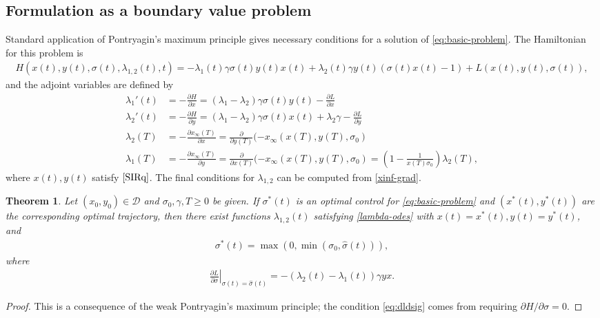 \documentclass[english,12pt,letter]{article}
\newtheorem{thm}{Theorem}
\newcommand{\Rnot}{\sigma_0}
\newcommand{\Sinf}{x_\infty}
\newcommand{\dom}{{\mathcal D}}
\begin{document}
\subsection{Formulation as a boundary value problem\label{sec:pmp}}
Standard application of Pontryagin's maximum principle gives necessary conditions
for a solution of \eqref{eq:basic-problem}.  The Hamiltonian for this problem is
\begin{align} \label{eq:ham}
    H(x(t),y(t), \sigma(t), \lambda_{1,2}(t), t) = -\lambda_1(t) \gamma \sigma(t) y(t) x(t) + \lambda_2(t)\gamma y(t)(\sigma(t) x(t) - 1) + L(x(t),y(t),\sigma(t)),
\end{align}
and the adjoint variables are defined by
\begin{subequations}\label{lambda-odes}
\begin{align} 
    \lambda_1'(t) & = -\frac{\partial H}{\partial x} = (\lambda_1-\lambda_2)\gamma\sigma(t) y(t) - \frac{\partial L}{\partial x} \\
    \lambda_2'(t) & = -\frac{\partial H}{\partial y} = (\lambda_1-\lambda_2)\gamma\sigma(t) x(t) + \lambda_2 \gamma - \frac{\partial L}{\partial y} \\
    \lambda_2(T) & = -\frac{\partial \Sinf(T)}{\partial x} = \frac{\partial }{\partial y(T)} (-x_\infty(x(T),y(T),\Rnot) \\
    \lambda_1(T) & = -\frac{\partial \Sinf(T)}{\partial y} =\frac{\partial }{\partial x(T)} (-x_\infty(x(T),y(T),\Rnot) = \left(1-\frac{1}{x(T)\Rnot}\right)\lambda_2(T),
\end{align}
\end{subequations}
where $x(t), y(t)$ satisfy $\eqref{SIRq}$.
The final conditions for $\lambda_{1,2}$ can be computed from \eqref{xinf-grad}.

\begin{thm}
    Let $(x_0, y_0)\in\dom$ and $\Rnot, \gamma, T\ge 0$ be given.  If $\sigma^*(t)$ is an optimal
    control for \eqref{eq:basic-problem} and $(x^*(t),y^*(t))$ are the corresponding optimal
    trajectory, then there exist functions
    $\lambda_{1,2}(t)$ satisfying \eqref{lambda-odes} with $x(t)=x^*(t), y(t)=y^*(t)$, and
    \begin{align} \label{eq:sigma-c2}
        \sigma^*(t) = \max\left(0,\min\left(\sigma_0,\hat{\sigma}(t)\right)\right),
    \end{align}
    where
    \begin{align} \label{eq:dldsig}
        \left. \frac{\partial L}{\partial \sigma}\right|_{\sigma(t)=\hat{\sigma}(t)} = - (\lambda_2(t)-\lambda_1(t))\gamma y x.
    \end{align}
\end{thm}
\begin{proof}
    This is a consequence of the weak Pontryagin's maximum principle; the condition \eqref{eq:dldsig}
    comes from requiring $\partial H/\partial \sigma = 0$.
\end{proof}
\end{document}
